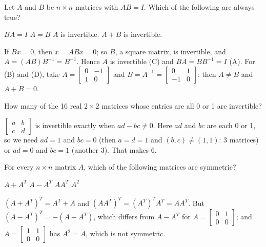 \begin{question}[id=mat-16, type=msq, marks=2]
Let $A$ and $B$ be $n \times n$ matrices with $AB = I$. Which of the following are always true?
\begin{options}
  \correct $BA = I$
  \option $A = B$
  \correct $A$ is invertible.
  \option $A + B$ is invertible.
\end{options}
\begin{solution}
If $Bx = 0$, then $x = ABx = 0$; so $B$, a square matrix, is invertible, and $A = (AB)B^{-1} = B^{-1}$. Hence $A$ is invertible (C) and $BA = BB^{-1} = I$ (A). For (B) and (D), take $A = \begin{bmatrix} 0 & -1 \\ 1 & 0 \end{bmatrix}$ and $B = A^{-1} = \begin{bmatrix} 0 & 1 \\ -1 & 0 \end{bmatrix}$: then $A \ne B$ and $A + B = 0$.
\end{solution}
\end{question}

\begin{question}[id=mat-17, marks=2]
How many of the 16 real $2 \times 2$ matrices whose entries are all 0 or 1 are invertible?
\begin{solution}
$\begin{bmatrix} a & b \\ c & d \end{bmatrix}$ is invertible exactly when $ad - bc \ne 0$. Here $ad$ and $bc$ are each 0 or 1, so we need $ad = 1$ and $bc = 0$ (then $a = d = 1$ and $(b, c) \ne (1, 1)$: 3 matrices) or $ad = 0$ and $bc = 1$ (another 3). That makes 6.
\end{solution}
\end{question}

\begin{question}[id=mat-18, type=msq]
For every $n \times n$ matrix $A$, which of the following matrices are symmetric?
\begin{options}
  \correct $A + A^T$
  \option $A - A^T$
  \correct $AA^T$
  \option $A^2$
\end{options}
\begin{solution}
$(A + A^T)^T = A^T + A$ and $(AA^T)^T = (A^T)^T A^T = AA^T$. But $(A - A^T)^T = -(A - A^T)$, which differs from $A - A^T$ for $A = \begin{bmatrix} 0 & 1 \\ 0 & 0 \end{bmatrix}$; and $A = \begin{bmatrix} 1 & 1 \\ 0 & 0 \end{bmatrix}$ has $A^2 = A$, which is not symmetric.
\end{solution}
\end{question}

